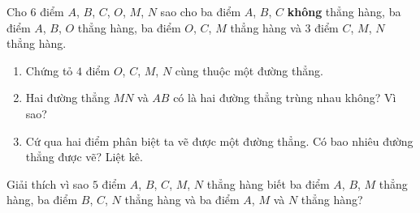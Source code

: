 \begin{bt}%
	Cho $ 6 $ điểm $ A $, $ B $, $ C $, $ O $, $ M $, $ N $ sao cho ba điểm $ A $, $ B $, $ C $ \textbf{không} thẳng hàng, ba điểm $ A $, $ B $, $ O $ thẳng hàng, ba điểm $ O $, $ C $, $ M $ thẳng hàng và $ 3 $ điểm $ C $, $ M $, $ N $ thẳng hàng.
	\begin{enumerate}
		\item Chứng tỏ $ 4 $ điểm $ O $, $ C $, $ M $, $ N $ cùng thuộc một đường thẳng.
		\item Hai đường thẳng $ MN $ và $ AB $ có là hai đường thẳng trùng nhau không? Vì sao?
		\item Cứ qua hai điểm phân biệt ta vẽ được một đường thẳng. Có bao nhiêu đường thẳng được vẽ? Liệt kê.
	\end{enumerate}
\end{bt}

\begin{bt}%
	Giải thích vì sao $ 5 $ điểm $ A $, $ B $, $ C $, $ M $, $ N $ thẳng hàng biết ba điểm $ A $, $ B $, $ M $ thẳng hàng, ba điểm $ B $, $ C $, $ N $ thẳng hàng và ba điểm $ A $, $ M $ và $ N $ thẳng hàng?
\end{bt}

